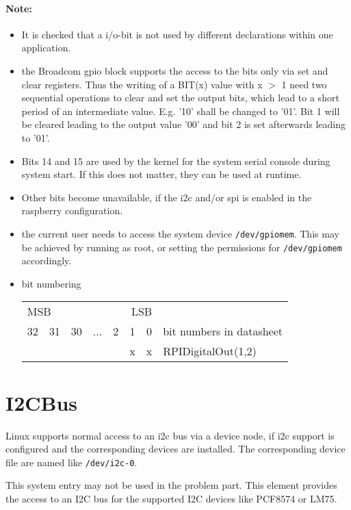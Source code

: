 \paragraph{Note:}  
\begin{itemize}
\item It is checked that a i/o-bit is not used by different declarations within
one application.
\item the Broadcom gpio block supports the access to the bits only 
via set and clear registers. Thus the writing of a BIT(x) value with x $>$ 1
need two sequential operations to clear and set the output bits, which lead
to a short period of an intermediate value. E.g. '10' shall be changed to '01'. Bit 1 will be cleared leading to the output value '00' and bit 2 
is set afterwards leading to '01'.

\item Bits 14 and 15 are used by the kernel for the 
  system serial console during system start. If this does not matter,
  they can be used at runtime.
\item Other bits become unavailable, if 
  the i2c and/or spi is enabled in the
  raspberry configuration.
\item the current user needs to access the system device 
  \verb|/dev/gpiomem|. This may be achieved by running as root, or setting
  the permissions for \verb|/dev/gpiomem| accordingly.
\item bit numbering\\
\begin{tabular}{|c|c|c|c|c|c|c|l}
\multicolumn{3}{l}{MSB}&\multicolumn{4}{r}{LSB}&\\
\cline{1-7}
 32 & 31 & 30 & ... & 2 & 1 & 0 & bit numbers in datasheet\\
\cline{1-7}
    &    &    &     &   & x & x & RPIDigitalOut(1,2) \\
\cline{1-7}
\end{tabular}

\end{itemize}

 
\section{I2CBus}
Linux supports normal access to an i2c bus via a device node,
 if i2c support is configured and the corresponding devices are installed.
The corresponding device file are named like \texttt{/dev/i2c-0}.

This system entry may not be used in the problem part. This element
provides the access to an I2C bus for the supported I2C devices like 
PCF8574 or LM75.

